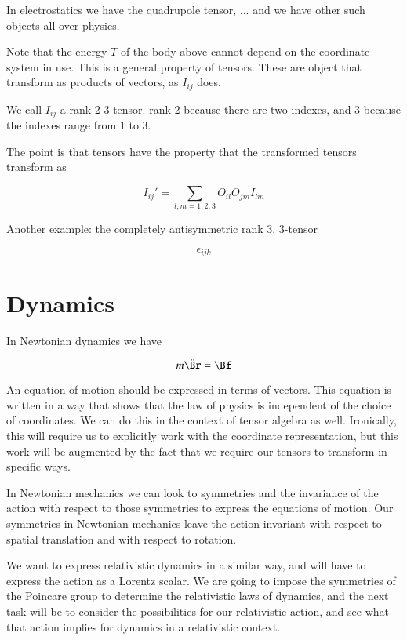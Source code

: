 In electrostatics we have the quadrupole tensor, ... and we have other such objects all over physics.

Note that the energy $T$ of the body above cannot depend on the coordinate system in use.  This is a general property of tensors.  These are object that transform as products of vectors, as $I_{ij}$ does.  

We call $I_{ij}$ a rank-2 3-tensor.  rank-2 because there are two indexes, and 3 because the indexes range from $1$ to $3$.

The point is that tensors have the property that the transformed tensors transform as

\begin{equation}\label{eqn:relativisticElectrodynamicsL6:230}
I_{ij}' = \sum_{l, m = 1,2,3} O_{il} O_{jm} I_{lm}
\end{equation}

Another example: the completely antisymmetric rank 3, 3-tensor

\begin{equation}\label{eqn:relativisticElectrodynamicsL6:240}
\epsilon_{ijk}
\end{equation}

\section{Dynamics}

In Newtonian dynamics we have 

\begin{equation}\label{eqn:relativisticElectrodynamicsL6:250}
m \ddot{\Br} = \Bf
\end{equation}

An equation of motion should be expressed in terms of vectors.  This equation is written in a way that shows that the law of physics is independent of the choice of coordinates.  We can do this in the context of tensor algebra as well.  Ironically, this will require us to explicitly work with the coordinate representation, but this work will be augmented by the fact that we require our tensors to transform in specific ways.

In Newtonian mechanics we can look to symmetries and the invariance of the action with respect to those symmetries to express the equations of motion.  Our symmetries in Newtonian mechanics leave the action invariant with respect to spatial translation and with respect to rotation.

We want to express relativistic dynamics in a similar way, and will have to express the action as a Lorentz scalar.  We are going to impose the symmetries of the Poincare group to determine the relativistic laws of dynamics, and the next task will be to consider the possibilities for our relativistic action, and see what that action implies for dynamics in a relativistic context.

\EndArticle
